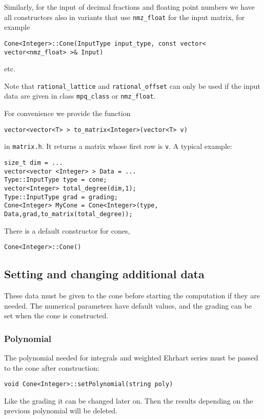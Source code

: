 \documentclass[12pt,a4paper]{scrartcl}
\theoremstyle{definition}
\begin{document}
\begin{small}
Similarly, for the input of decimal fractions and floating point numbers we have all constructors also in variants that use \verb|nmz_float| for the input matrix, for example
\begin{Verbatim}
Cone<Integer>::Cone(InputType input_type, const vector< vector<nmz_float> >& Input)
\end{Verbatim}
etc.

Note that \verb|rational_lattice| and \verb|rational_offset| can only be used if the input data are given in class \verb|mpq_class| or \verb|nmz_float|.

For convenience we provide the function
\begin{Verbatim}
vector<vector<T> > to_matrix<Integer>(vector<T> v)
\end{Verbatim}
in \verb|matrix.h|. It returns a matrix whose first row is \verb|v|. A typical example:
\begin{Verbatim}
size_t dim = ...
vector<vector <Integer> > Data = ...
Type::InputType type = cone;
vector<Integer> total_degree(dim,1);
Type::InputType grad = grading;
Cone<Integer> MyCone = Cone<Integer>(type, Data,grad,to_matrix(total_degree));
\end{Verbatim}

There is a default constructor for cones,
\begin{Verbatim}
Cone<Integer>::Cone()
\end{Verbatim}

\subsection{Setting and changing additional data}

These data must be given to the cone before starting the computation if they are needed.
The numerical parameters have default values, and the grading can be set when the cone is constructed.

\subsubsection{Polynomial}

The polynomial needed for integrals and weighted Ehrhart series must be passed to the cone after construction:
\begin{Verbatim}
void Cone<Integer>::setPolynomial(string poly)
\end{Verbatim}

Like the grading it can be changed later on. Then the results depending on the previous polynomial will be deleted.


\end{small}
\end{document}
